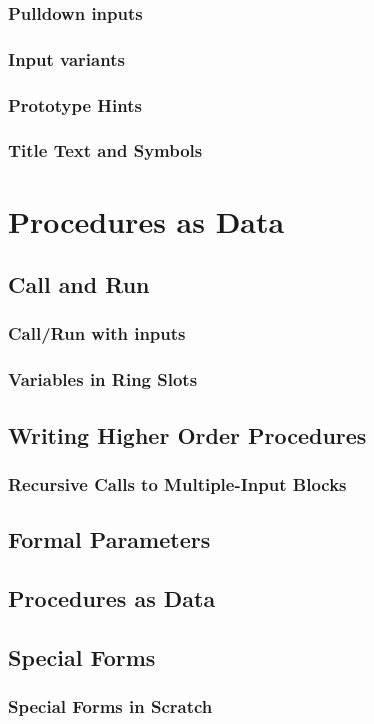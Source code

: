 \documentclass{report}
\begin{document}
\subsection{Pulldown inputs}
\subsection{Input variants}
\subsection{Prototype Hints}
\subsection{Title Text and Symbols}
\chapter{Procedures as Data}
\section{Call and Run}
\subsection{Call/Run with inputs}
\subsection{Variables in Ring Slots}
\section{Writing Higher Order Procedures}
\subsection{Recursive Calls to Multiple-Input Blocks}
\section{Formal Parameters}
\section{Procedures as Data}
\section{Special Forms}
\subsection{Special Forms in Scratch}
\end{document}
